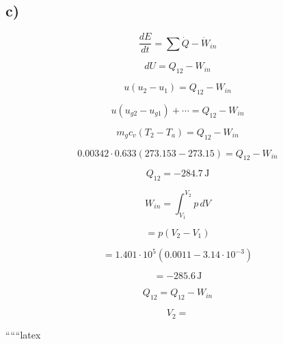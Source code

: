 

\subsection*{c)}

\[
\frac{dE}{dt} = \sum \dot{Q} - \dot{W}_{in}
\]

\[
dU = Q_{12} - W_{in}
\]

\[
u(u_2 - u_1) = Q_{12} - W_{in}
\]

\[
u(u_{g2} - u_{g1}) + \cdots = Q_{12} - W_{in}
\]

\[
m_{g} c_v (T_2 - T_a) = Q_{12} - W_{in}
\]

\[
0.00342 \cdot 0.633 (273.153 - 273.15) = Q_{12} - W_{in}
\]

\[
Q_{12} = -284.7 \, \text{J}
\]

\[
W_{in} = \int_{V_1}^{V_2} p \, dV
\]

\[
= p (V_2 - V_1)
\]

\[
= 1.401 \cdot 10^5 \left(0.0011 - 3.14 \cdot 10^{-3}\right)
\]

\[
= -285.6 \, \text{J}
\]

\[
Q_{12} = Q_{12} - W_{in}
\]

\[
V_2 =
\]

``````latex